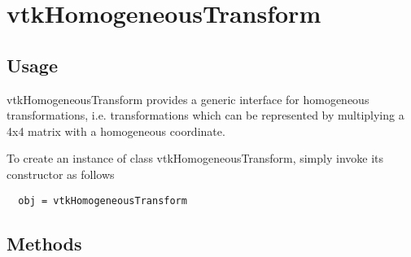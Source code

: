 \section{vtkHomogeneousTransform}

\subsection{Usage}

 vtkHomogeneousTransform provides a generic interface for homogeneous 
 transformations, i.e. transformations which can be represented by 
 multiplying a 4x4 matrix with a homogeneous coordinate. 

To create an instance of class vtkHomogeneousTransform, simply
invoke its constructor as follows
\begin{verbatim}
  obj = vtkHomogeneousTransform
\end{verbatim}
\subsection{Methods}

